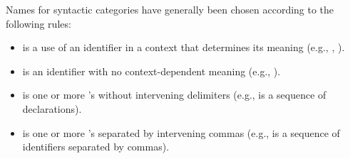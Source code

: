 \pnum
Names for syntactic categories have generally been chosen according to
the following rules:
\begin{itemize}
\item {} is a use of an identifier in a context that
determines its meaning (e.g., ,
).
\item {} is an identifier with no context-dependent meaning
(e.g., ).
\item {} is one or more 's without intervening
delimiters (e.g.,  is a sequence of
declarations).
\item {} is one or more 's separated by
intervening commas (e.g.,  is a sequence of
identifiers separated by commas).
\end{itemize}%
